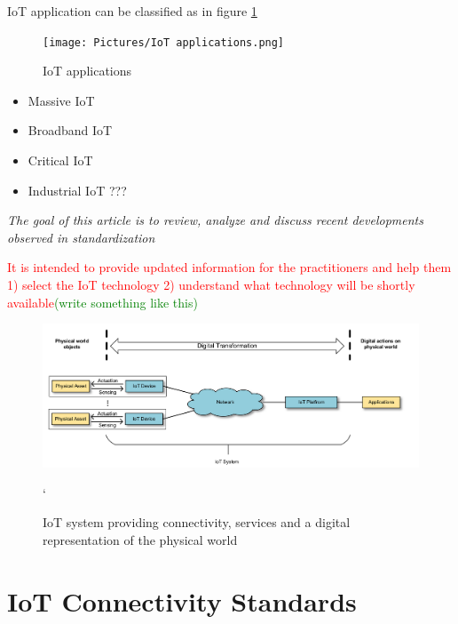 \documentclass[conference]{IEEEtran}
\newcommand{\CAREPL}[2]{{\textcolor{red}{#1}}{\textcolor{green}{#2}}} %
\begin{document}
IoT application can be classified as in figure \ref{fig:IoT_applications}

\begin{figure}
\centerline{\texttt{[image: Pictures/IoT applications.png]}}
\caption{IoT applications}
\label{fig:IoT_applications}
\end{figure}


\begin{itemize}
    \item   Massive IoT
    \item   Broadband IoT
    \item   Critical IoT
    \item   Industrial IoT ???
\end{itemize}


\emph{The goal of this article is to review, analyze and discuss recent developments observed in standardization }



\CAREPL{It is intended to provide updated information for the practitioners and help them 1) select the IoT technology 2) understand what technology will be shortly available}{(write something like this)}



\begin{figure}
\centerline{\includegraphics[width=\linewidth]{Pictures/IoT system providing connectivity, services and a digital representation of the physical world.png}}
\caption{IoT system providing connectivity, services and a digital representation of the physical world}`
\label{fig:IoT_sys-ex}
\end{figure}



\section{IoT Connectivity Standards}
\label{sec:2-IoT-Connectivity}
\end{document}
